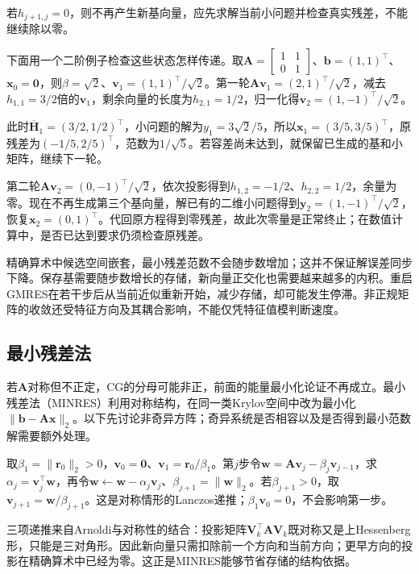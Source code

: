 若$h_{j+1,j}=0$，则不再产生新基向量，应先求解当前小问题并检查真实残差，不能继续除以零。

下面用一个二阶例子检查这些状态怎样传递。取$\bm A=\left[\begin{smallmatrix}1&1\\0&1\end{smallmatrix}\right]$、$\bm b=(1,1)^\top$、$\bm x_0=\bm0$，则$\beta=\sqrt2$、$\bm v_1=(1,1)^\top/\sqrt2$。第一轮$\bm A\bm v_1=(2,1)^\top/\sqrt2$，减去$h_{1,1}=3/2$倍的$\bm v_1$，剩余向量的长度为$h_{2,1}=1/2$，归一化得$\bm v_2=(1,-1)^\top/\sqrt2$。

此时$\overline{\bm H}_1=(3/2,1/2)^\top$，小问题的解为$y_1=3\sqrt2/5$，所以$\bm x_1=(3/5,3/5)^\top$，原残差为$(-1/5,2/5)^\top$，范数为$1/\sqrt5$。若容差尚未达到，就保留已生成的基和小矩阵，继续下一轮。

第二轮$\bm A\bm v_2=(0,-1)^\top/\sqrt2$，依次投影得到$h_{1,2}=-1/2$、$h_{2,2}=1/2$，余量为零。现在不再生成第三个基向量，解已有的二维小问题得到$\bm y_2=(1,-1)^\top/\sqrt2$，恢复$\bm x_2=(0,1)^\top$。代回原方程得到零残差，故此次零量是正常终止；在数值计算中，是否已达到要求仍须检查原残差。

精确算术中候选空间嵌套，最小残差范数不会随步数增加；这并不保证解误差同步下降。保存基需要随步数增长的存储，新向量正交化也需要越来越多的内积。重启GMRES在若干步后从当前近似重新开始，减少存储，却可能发生停滞。非正规矩阵的收敛还受特征方向及其耦合影响，不能仅凭特征值模判断速度。

\subsection{最小残差法}

若$\bm A$对称但不正定，CG的分母可能非正，前面的能量最小化论证不再成立。最小残差法（MINRES）利用对称结构，在同一类Krylov空间中改为最小化$\lVert\bm b-\bm A\bm x\rVert_2$。以下先讨论非奇异方阵；奇异系统是否相容以及是否得到最小范数解需要额外处理。

取$\beta_1=\lVert\bm r_0\rVert_2>0$，$\bm v_0=\bm0$、$\bm v_1=\bm r_0/\beta_1$。第$j$步令$\bm w=\bm A\bm v_j-\beta_j\bm v_{j-1}$，求$\alpha_j=\bm v_j^\top\bm w$，再令$\bm w\leftarrow\bm w-\alpha_j\bm v_j$、$\beta_{j+1}=\lVert\bm w\rVert_2$。若$\beta_{j+1}>0$，取$\bm v_{j+1}=\bm w/\beta_{j+1}$。这是对称情形的Lanczos递推；$\beta_1\bm v_0=0$，不会影响第一步。

三项递推来自Arnoldi与对称性的结合：投影矩阵$\bm V_k^\top\bm A\bm V_k$既对称又是上Hessenberg形，只能是三对角形。因此新向量只需扣除前一个方向和当前方向；更早方向的投影在精确算术中已经为零。这正是MINRES能够节省存储的结构依据。

